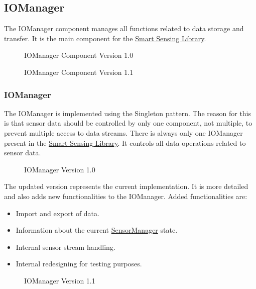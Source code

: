 \documentclass[12pt]{article}
\begin{document}
\subsection{IOManager}
\label{sec:CIOManager}
The IOManager component manages all functions related to data storage and transfer. It is the main component for the \hyperref[sec:SmartSensingLibrary]{Smart Sensing Library}.
\begin{figure}[ht]
\centering

\caption{\label{fig:bild5} IOManager Component Version 1.0}
\end{figure}

\begin{figure}[ht]
\centering

\caption{\label{fig:bild6} IOManager Component Version 1.1}
\end{figure}


\subsubsection{IOManager}
\label{sec:IOManager}
The IOManager is implemented using the Singleton pattern. The reason for this is that sensor data should be controlled by only one component, not multiple, to prevent multiple access to data streams. There is always only one IOManager present in the \hyperref[sec:SmartSensingLibrary]{Smart Sensing Library}. It controls all data operations related to sensor data.
\begin{figure}[ht]
\centering

\caption{\label{fig:bild7} IOManager Version 1.0}
\end{figure}

The updated version represents the current implementation. It is more detailed and also adds new functionalities to the IOManager. Added functionalities are:   
\begin{itemize}
  \item Import and export of data.
  \item Information about the current \hyperref[sec:SensorManager]{SensorManager} state.
  \item Internal sensor stream handling.
  \item Internal redesigning for testing purposes. 
\end{itemize}


\begin{figure}[ht]
\centering

\caption{\label{fig:bild8} IOManager Version 1.1}
\end{figure}
\end{document}
